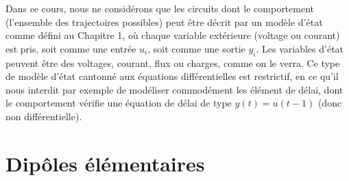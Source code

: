 Dans ce cours, 
nous ne considérons que les circuits dont le comportement 
(l'ensemble des trajectoires possibles) peut être décrit par un modèle d'état 
comme défini au Chapitre 1, où chaque variable extérieure (voltage ou courant) 
est pris, soit comme une entrée $u_i$, soit comme une sortie $y_i$. 
Les variables d'état peuvent être des voltages, courant, flux ou charges,
 comme on le verra. Ce type de modèle d'état cantonné aux équations différentielles est restrictif, en ce qu'il nous interdit par exemple de modéliser commodément les élément de délai, dont le comportement vérifie une équation de délai de type $y(t)=u(t-1)$ (donc non différentielle). 



\section{Dipôles élémentaires}


